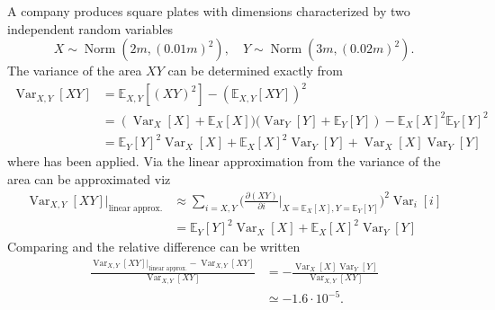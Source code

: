 \begin{example}
	A company produces square plates with dimensions characterized by two independent random variables
	\begin{equation}
		X\sim \operatorname{Norm}(2m,(0.01m)^2), \quad Y\sim \operatorname{Norm}(3m,(0.02m)^2).
	\end{equation} 
	The variance of the area $XY$ can be determined exactly from 
	\begin{equation}
		\label{eq:var1}
		\begin{split}
			\operatorname{Var}_{X,Y}[XY]&=\mathbb{E}_{X,Y}[(XY)^2]-(\mathbb{E}_{X,Y}[XY])^2\\
			&=(\operatorname{Var}_X[X]+\mathbb{E}_X[X]\bigg)\bigg(\operatorname{Var}_Y[Y]+\mathbb{E}_Y[Y])-\mathbb{E}_X[X]^2\mathbb{E}_Y[Y]^2\\
			&=\mathbb{E}_Y[Y]^2\operatorname{Var}_X[X]+\mathbb{E}_X[X]^2\operatorname{Var}_Y[Y]+\operatorname{Var}_X[X]\operatorname{Var}_Y[Y]
		\end{split}
	\end{equation}
	where  has been applied.	Via the linear approximation from  the variance of the area can be approximated viz
	\begin{equation}
		\label{eq:var2}
		\begin{split}
			\operatorname{Var}_{X,Y}[XY]|_{\text{linear approx.}}&\approx\sum_{i = X,Y} \bigg( \frac{\partial (XY)}{\partial i}\bigg|_{X = \mathbb{E}_X[X],Y = \mathbb{E}_Y[Y]}  \bigg)^2\operatorname{Var}_i[i]\\
			&=\mathbb{E}_Y[Y]^2\operatorname{Var}_X[X]+\mathbb{E}_X[X]^2\operatorname{Var}_Y[Y]
		\end{split}
	\end{equation}
	Comparing  and  the relative difference can be written
	\begin{equation}
		\begin{split}
			\frac{\operatorname{Var}_{X,Y}[XY]|_{\text{linear approx.}}-\operatorname{Var}_{X,Y}[XY]}{\operatorname{Var}_{X,Y}[XY]} &= -\frac{\operatorname{Var}_X[X]\operatorname{Var}_Y[Y]}{\operatorname{Var}_{X,Y}[XY]}\\
			& \simeq -1.6\cdot 10^{-5}.
		\end{split}
	\end{equation}
	
\end{example}

